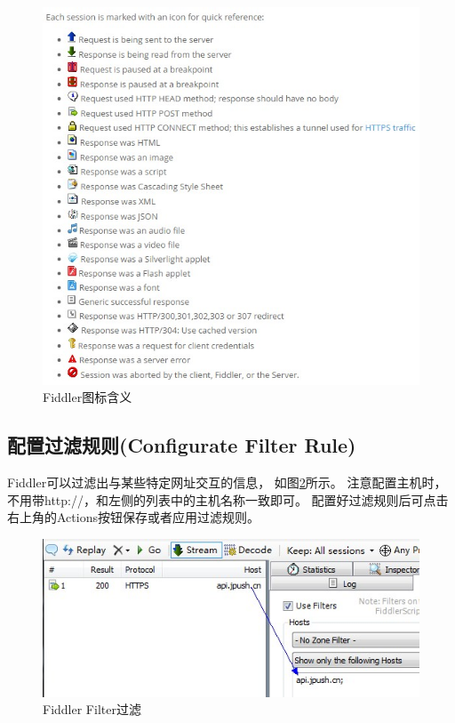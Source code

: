 \documentclass{book}
\begin{document}
\begin{figure}[htbp]
	\centering
	\includegraphics[scale=1]{MeaningOfFiddlerIcon.jpg}
	\caption{Fiddler图标含义}
	\label{fig:MeaningOfFiddlerIcon}
\end{figure}

\subsection{配置过滤规则(Configurate Filter Rule)}

Fiddler可以过滤出与某些特定网址交互的信息，
如图\ref{fig:FiddlerFilter}所示。
注意配置主机时，不用带http://，和左侧的列表中的主机名称一致即可。
配置好过滤规则后可点击右上角的Actions按钮保存或者应用过滤规则。

\begin{figure}[htbp]
	\centering
	\includegraphics[scale=0.8]{FiddlerFilter.jpg}
	\caption{Fiddler Filter过滤}
	\label{fig:FiddlerFilter}
\end{figure}
\end{document}
